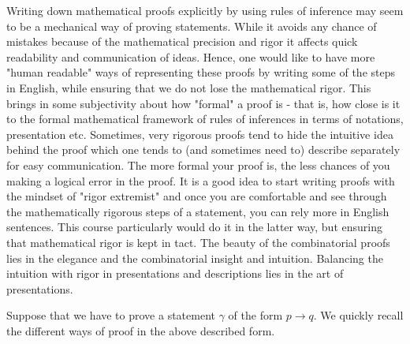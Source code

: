 Writing down mathematical proofs explicitly by using rules of inference may seem to be a mechanical way of proving statements. While it avoids any chance of mistakes because of the mathematical precision and rigor it affects quick readability and communication of ideas. Hence, one would like to have more "human readable" ways of representing these proofs by writing some of the steps in English, while ensuring that we do not lose the mathematical rigor. This brings in some subjectivity about how "formal" a proof is - that is, how close is it to the formal mathematical framework of rules of inferences in terms of notations, presentation etc.  Sometimes, very rigorous proofs tend to hide the intuitive idea behind the proof which one tends to (and sometimes need to) describe separately for easy communication. The more formal your proof is, the less chances of you making a logical error in the proof. It is a good idea to start writing proofs with the mindset of "rigor extremist" and once you are comfortable and see through the mathematically rigorous steps of a statement, you can rely more in English sentences. This course particularly would do it in the latter way, but ensuring that mathematical rigor is kept in tact. The beauty of the combinatorial proofs lies in the elegance and the combinatorial insight and intuition. Balancing the intuition with rigor in presentations and descriptions lies in the art of presentations.

Suppose that we have to prove a statement $\gamma$ of the form $p \rightarrow q$.  We quickly recall the different ways of proof in the above described form. 

